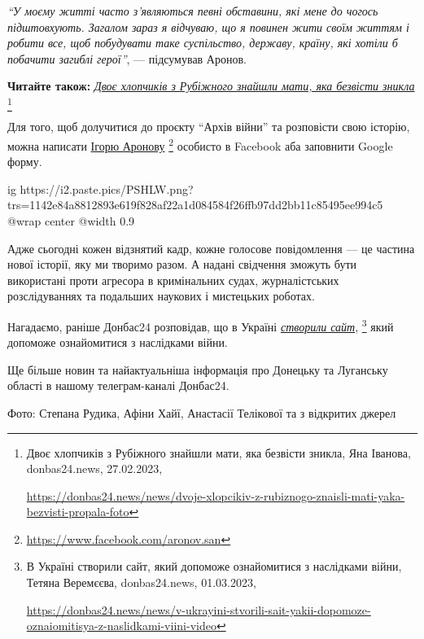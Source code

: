 \begin{leftbar}
\emph{\enquote{У моєму житті часто з'являються певні обставини, які мене до чогось
підштовхують. Загалом зараз я відчуваю, що я повинен жити своїм життям і робити
все, щоб побудувати таке суспільство, державу, країну, які хотіли б побачити
загиблі герої}}, — підсумував Аронов. 
\end{leftbar}

\textbf{Читайте також:} \href{https://donbas24.news/news/dvoje-xlopcikiv-z-rubiznogo-znaisli-mati-yaka-bezvisti-propala-foto}{\emph{Двоє хлопчиків з Рубіжного знайшли мати, яка безвісти зникла}}%
\footnote{Двоє хлопчиків з Рубіжного знайшли мати, яка безвісти зникла, Яна Іванова, donbas24.news, 27.02.2023, \par%
\url{https://donbas24.news/news/dvoje-xlopcikiv-z-rubiznogo-znaisli-mati-yaka-bezvisti-propala-foto}%
}


Для того, щоб долучитися до проєкту \enquote{Архів війни} та розповісти свою історію,
можна написати \href{https://www.facebook.com/aronov.san}{Ігорю Аронову}%
\footnote{\url{https://www.facebook.com/aronov.san}}
особисто в Facebook аба заповнити Google форму.%

\ifcmt
  ig https://i2.paste.pics/PSHLW.png?trs=1142e84a8812893e619f828af22a1d084584f26ffb97dd2bb11c85495ee994c5
  @wrap center
  @width 0.9
\fi

Адже сьогодні кожен відзнятий кадр, кожне голосове повідомлення — це частина
нової історії, яку ми творимо разом. А надані свідчення зможуть бути
використані проти агресора в кримінальних судах, журналістських розслідуваннях
та подальших наукових і мистецьких роботах.

Нагадаємо, раніше Донбас24 розповідав, що в Україні \href{https://donbas24.news/news/v-ukrayini-stvorili-sait-yakii-dopomoze-oznaiomitisya-z-naslidkami-viini-video}{\emph{створили сайт}},%
\footnote{В Україні створили сайт, який допоможе ознайомитися з наслідками війни, Тетяна Веремєєва, donbas24.news, 01.03.2023, \par\url{https://donbas24.news/news/v-ukrayini-stvorili-sait-yakii-dopomoze-oznaiomitisya-z-naslidkami-viini-video}}
який допоможе ознайомитися з наслідками війни.

Ще більше новин та найактуальніша інформація про Донецьку та Луганську області
в нашому телеграм-каналі Донбас24.

Фото: Степана Рудика, Афіни Хайї, Анастасії Телікової та з відкритих джерел

